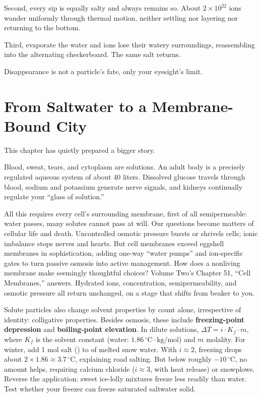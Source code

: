 Second, every sip is equally salty and always remains so. About $2\times 10^{22}$ ions wander uniformly through thermal motion, neither settling nor layering nor returning to the bottom.

Third, evaporate the water and ions lose their watery surroundings, reassembling into the alternating checkerboard. The same salt returns.

Disappearance is not a particle's fate, only your eyesight's limit.

\section{From Saltwater to a Membrane-Bound City}

This chapter has quietly prepared a bigger story.

Blood, sweat, tears, and cytoplasm are solutions. An adult body is a precisely regulated aqueous system of about 40 liters. Dissolved glucose travels through blood, sodium and potassium generate nerve signals, and kidneys continually regulate your ``glass of solution.''

All this requires every cell's surrounding membrane, first of all semipermeable: water passes, many solutes cannot pass at will. Our questions become matters of cellular life and death. Uncontrolled osmotic pressure bursts or shrivels cells; ionic imbalance stops nerves and hearts. But cell membranes exceed eggshell membranes in sophistication, adding one-way ``water pumps'' and ion-specific gates to turn passive osmosis into active management. How does a nonliving membrane make seemingly thoughtful choices? Volume Two's Chapter 51, ``Cell Membranes,'' answers. Hydrated ions, concentration, semipermeability, and osmotic pressure all return unchanged, on a stage that shifts from beaker to you.

\begin{tiaozhan}
Solute particles also change solvent properties by count alone, irrespective of identity: colligative properties. Besides osmosis, these include \textbf{freezing-point depression} and \textbf{boiling-point elevation}. In dilute solutions, $\Delta T = i\cdot K_f\cdot m$, where $K_f$ is the solvent constant (water: $1.86\,^{\circ}\mathrm{C\cdot kg/mol}$) and $m$ molality. For winter, add 1 mol salt () to  of melted snow water. With $i\approx 2$, freezing drops about $2\times 1.86\approx 3.7\,^{\circ}\mathrm{C}$, explaining road salting. But below roughly $-10\,^{\circ}\mathrm{C}$, no amount helps, requiring calcium chloride ($i\approx 3$, with heat release) or snowplows. Reverse the application: sweet ice-lolly mixtures freeze less readily than water. Test whether your freezer can freeze saturated saltwater solid.
\end{tiaozhan}

